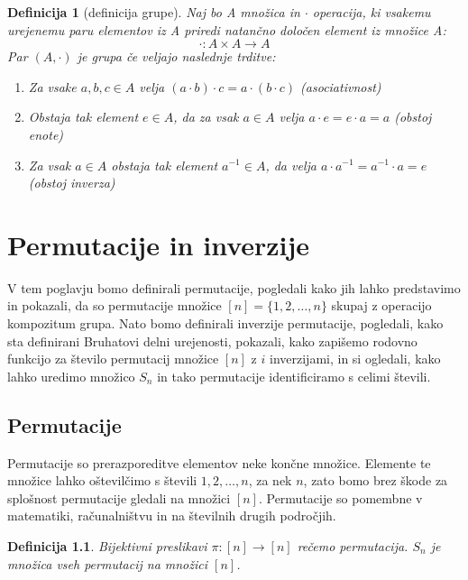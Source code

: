 \documentclass[a4paper, 12pt]{book}
\newtheorem{definicija}{Definicija}[chapter]
\begin{document}
\begin{definicija}[definicija grupe]
    Naj bo A množica in $\cdot$ operacija, ki vsakemu urejenemu paru elementov iz A priredi natančno določen element iz množice A:
    \[
        \cdot:A \times A \rightarrow A 
    \]
    Par $(A, \cdot)$ je grupa če veljajo naslednje trditve:
    \begin{enumerate}
        \item Za vsake $a, b, c \in A$ velja $(a \cdot b) \cdot c = a \cdot (b \cdot c)$ (asociativnost)
        \item Obstaja tak element $e \in A$, da za vsak $a \in A$ velja $a \cdot e = e \cdot a = a$ (obstoj enote)
        \item Za vsak $a \in A$ obstaja tak element $a^{-1} \in A$, da velja $a \cdot a^{-1} = a^{-1} \cdot a = e$ (obstoj inverza)
        
    \end{enumerate}
\end{definicija}

\chapter{ Permutacije in inverzije }

V tem poglavju bomo definirali permutacije, pogledali kako jih lahko predstavimo in pokazali, da so permutacije množice $[n] = \{ 1, 2, \dots, n\}$ skupaj z operacijo kompozitum grupa. Nato bomo definirali inverzije permutacije, pogledali, kako sta definirani Bruhatovi delni urejenosti, pokazali, kako zapišemo rodovno funkcijo za število permutacij množice $[n]$ z $i$ inverzijami, in si ogledali, kako lahko uredimo množico $S_n$ in tako permutacije identificiramo s celimi števili.

\section{ Permutacije }

Permutacije so prerazporeditve elementov neke končne množice. Elemente te množice lahko oštevilčimo s števili $1, 2, \dots, n$, za nek $n$, zato bomo brez škode za splošnost permutacije gledali na množici $[n]$. 
Permutacije so pomembne v matematiki, računalništvu in na številnih drugih področjih. 



\begin{definicija}
Bijektivni preslikavi $\pi: [n] \rightarrow [n]$ rečemo permutacija. $S_n$ je množica vseh permutacij na množici $[n]$.
\end{definicija}
\end{document}
